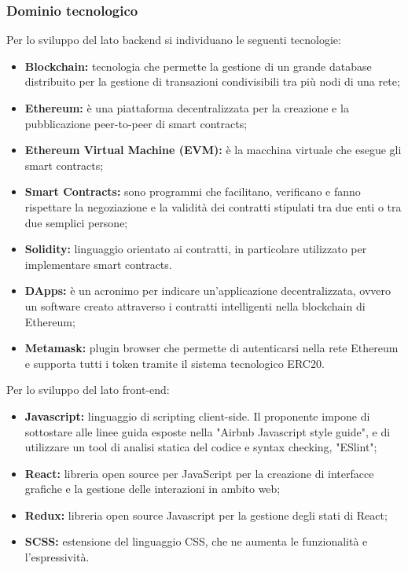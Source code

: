 \subsubsection{Dominio tecnologico}
Per lo sviluppo del lato backend si individuano le seguenti tecnologie:
\begin{itemize}
    \item \textbf{Blockchain:} tecnologia che permette la gestione di un grande 
database distribuito per la gestione di transazioni condivisibili tra più nodi 
di una rete;
	\item \textbf{Ethereum:} è una piattaforma decentralizzata per la creazione
	e la pubblicazione peer-to-peer di smart contracts;
	\item \textbf{Ethereum Virtual Machine (EVM):} è la macchina virtuale che 
esegue gli smart contracts;
	\item \textbf{Smart Contracts:} sono programmi che facilitano, verificano e 
fanno rispettare la negoziazione e la validità dei contratti stipulati tra due 
enti o tra due semplici persone;
	\item \textbf{Solidity:} linguaggio orientato ai contratti, in particolare 
utilizzato per implementare smart contracts.
	\item \textbf{DApps:} è un acronimo per indicare un'applicazione 
decentralizzata, ovvero un software creato attraverso i contratti intelligenti 
nella blockchain di Ethereum;
	\item \textbf{Metamask:} plugin browser che permette di autenticarsi nella rete 
Ethereum e supporta tutti i token tramite il sistema tecnologico ERC20.
\end{itemize}

Per lo sviluppo del lato front-end:
\begin{itemize}
	\item \textbf{Javascript:} linguaggio di scripting client-side. Il proponente 
impone di sottostare alle linee guida esposte nella "Airbnb Javascript style 
guide", e di utilizzare un tool di analisi statica del codice e syntax checking, 
"ESlint"\glo;
	\item \textbf{React:}  libreria open source per JavaScript per la creazione di 
interfacce grafiche e la gestione delle interazioni in ambito web;
	\item \textbf {Redux:} libreria open source Javascript per la gestione degli 
stati di React;
	\item \textbf{SCSS:} estensione del linguaggio CSS, che ne aumenta le 
funzionalità e l'espressività.
\end{itemize}


